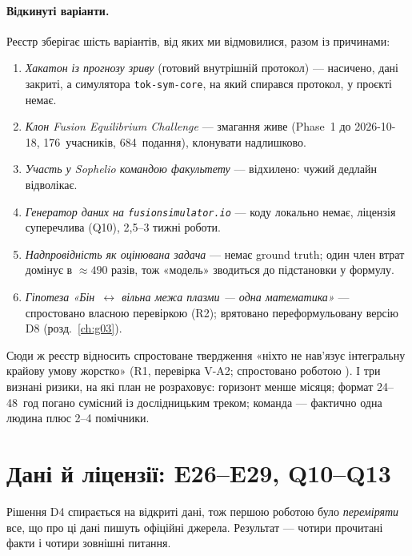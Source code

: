 \paragraph{Відкинуті варіанти.} Реєстр зберігає шість варіантів, від яких ми відмовилися,
разом із причинами:
\begin{enumerate}
\item \emph{Хакатон із прогнозу зриву} (готовий внутрішній протокол) --- насичено, дані
  закриті, а симулятора \texttt{tok-sym-core}, на який спирався протокол, у проєкті немає.
\item \emph{Клон Fusion Equilibrium Challenge} --- змагання живе (Phase~1 до 2026-10-18,
  176~учасників, 684~подання), клонувати надлишково.
\item \emph{Участь у Sophelio командою факультету} --- відхилено: чужий дедлайн відволікає.
\item \emph{Генератор даних на \texttt{fusionsimulator.io}} --- коду локально немає,
  ліцензія суперечлива (Q10), 2,5--3 тижні роботи.
\item \emph{Надпровідність як оцінювана задача} --- немає ground truth; один член втрат
  домінує в $\approx490$ разів, тож «модель» зводиться до підстановки у формулу.
\item \emph{Гіпотеза «Бін~$\leftrightarrow$ вільна межа плазми --- одна математика»} ---
  спростовано власною перевіркою (R2); врятовано переформульовану версію D8
  (розд.~\ref{ch:g03}).
\end{enumerate}
Сюди ж реєстр відносить спростоване твердження «ніхто не нав'язує інтегральну крайову
умову жорстко» (R1, перевірка V-A2; спростовано роботою \cite{McClenaghan2024}). І три визнані ризики, на які план не розраховує:
горизонт менше місяця; формат 24--48~год погано сумісний із дослідницьким треком; команда
--- фактично одна людина плюс 2--4 помічники.

\section{Дані й ліцензії: E26--E29, Q10--Q13}\label{sec:g01-data}

Рішення D4 спирається на відкриті дані, тож першою роботою було \emph{переміряти} все, що
про ці дані пишуть офіційні джерела. Результат --- чотири прочитані факти і чотири зовнішні
питання.

